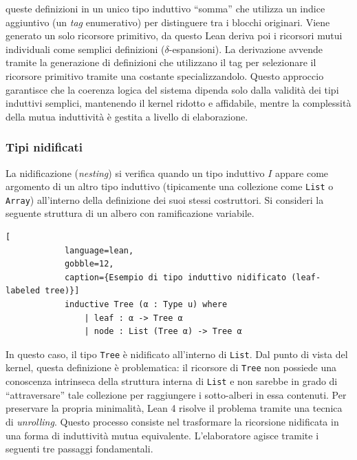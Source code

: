 queste definizioni in un unico tipo induttivo ``somma'' che utilizza un indice aggiuntivo (un \textit{tag} enumerativo) per distinguere tra i blocchi originari. Viene 
generato un solo ricorsore primitivo, da questo Lean deriva poi i ricorsori mutui individuali come semplici definizioni ($\delta$-espansioni). La derivazione avvende
tramite la generazione di definizioni che utilizzano il tag per selezionare il ricorsore primitivo tramite una costante specializzandolo. Questo approccio garantisce 
che la coerenza logica del sistema dipenda solo dalla validità dei tipi induttivi semplici, mantenendo il kernel ridotto e affidabile, mentre la complessità della mutua 
induttività è gestita a livello di elaborazione. 

\subsubsection{Tipi nidificati}
La nidificazione (\textit{nesting}) si verifica quando un tipo induttivo $I$ appare come argomento di un altro tipo induttivo (tipicamente una collezione come 
\texttt{List} o \texttt{Array}) all'interno della definizione dei suoi stessi costruttori. Si consideri la seguente struttura di un albero con ramificazione variabile.
\begin{center}
    \begin{minipage}{0.85\textwidth}
        \begin{lstlisting}[
            language=lean, 
            gobble=12, 
            caption={Esempio di tipo induttivo nidificato (leaf-labeled tree)}]
            inductive Tree (α : Type u) where
                | leaf : α -> Tree α
                | node : List (Tree α) -> Tree α
        \end{lstlisting}
    \end{minipage}
\end{center}
In questo caso, il tipo \texttt{Tree} è nidificato all'interno di \texttt{List}. Dal punto di vista del kernel, questa definizione è problematica: il ricorsore 
di \texttt{Tree} non possiede una conoscenza intrinseca della struttura interna di \texttt{List} e non sarebbe in grado di ``attraversare'' tale collezione per 
raggiungere i sotto-alberi in essa contenuti. Per preservare la propria minimalità, Lean 4 risolve il problema tramite una tecnica di \emph{unrolling}. Questo 
processo consiste nel trasformare la ricorsione nidificata in una forma di induttività mutua equivalente. L'elaboratore agisce tramite i seguenti tre passaggi 
fondamentali.
